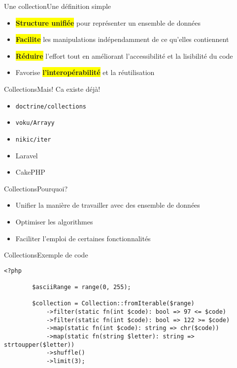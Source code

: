 \begin{frame}{Une collection}{Une définition simple}
    \begin{itemize}[<+->]
        \item \colorbox{yellow}{\textbf{Structure unifiée}} pour représenter un ensemble de données
        \item \colorbox{yellow}{\textbf{Facilite}} les manipulations indépendamment de ce qu'elles contiennent
        \item \colorbox{yellow}{\textbf{Réduire}} l'effort tout en améliorant l'accessibilité et la lisibilité du code
        \item Favorise \colorbox{yellow}{\textbf{l'interopérabilité}} et la réutilisation
    \end{itemize}
\end{frame}

\begin{frame}{Collections}{Mais! Ca existe déjà!}
    \begin{itemize}[<+->]
        \item \texttt{doctrine/collections}
        \item \texttt{voku/Arrayy}
        \item \texttt{nikic/iter}
        \item Laravel
        \item CakePHP
    \end{itemize}
\end{frame}

\begin{frame}{Collections}{Pourquoi?}
    \begin{itemize}[<+->]
        \item Unifier la manière de travailler avec des ensemble de données
        \item Optimiser les algorithmes
        \item Faciliter l'emploi de certaines fonctionnalités
    \end{itemize}
\end{frame}

\begin{frame}[fragile]{Collections}{Exemple de code}
    \begin{lstlisting}[firstnumber=1]
        <?php

        $asciiRange = range(0, 255);

        $collection = Collection::fromIterable($range)
            ->filter(static fn(int $code): bool => 97 <= $code)
            ->filter(static fn(int $code): bool => 122 >= $code)
            ->map(static fn(int $code): string => chr($code))
            ->map(static fn(string $letter): string => strtoupper($letter))
            ->shuffle()
            ->limit(3);

    \end{lstlisting}
\end{frame}

